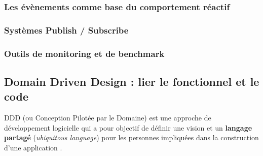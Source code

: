	\subsubsection{Les évènements comme base du comportement réactif}
	\subsubsection{Systèmes Publish / Subscribe}
	\subsubsection{Outils de monitoring et de benchmark}
	
	\subsection{Domain Driven Design : lier le fonctionnel et le code}
	
	\gls{DDD} (ou Conception Pilotée par le Domaine) est une approche de 
	développement logicielle qui a pour objectif de définir une vision et un 
	\textbf{langage partagé} (\textit{ubiquitous language}) pour les personnes 
	impliquées dans la construction d'une application \cite{Evans2003}. 
	
